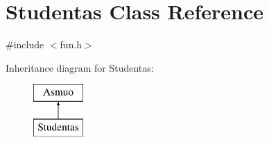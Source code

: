 \hypertarget{class_studentas}{}\section{Studentas Class Reference}
\label{class_studentas}


{\ttfamily \#include $<$fun.\+h$>$}

Inheritance diagram for Studentas\+:\begin{figure}[H]
\begin{center}
\leavevmode
\includegraphics[height=2.000000cm]{class_studentas}
\end{center}
\end{figure}
